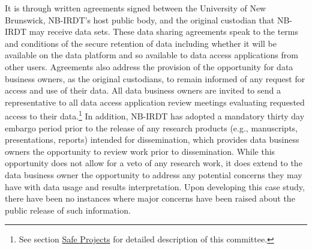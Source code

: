 \documentclass[
]{book}
\begin{document}
It is through written agreements signed between the University of New Brunswick, NB-IRDT's host public body, and the original custodian that NB-IRDT may receive data sets. These data sharing agreements speak to the terms and conditions of the secure retention of data including whether it will be available on the data platform and so available to data access applications from other users. Agreements also address the provision of the opportunity for data business owners, as the original custodians, to remain informed of any request for access and use of their data. All data business owners are invited to send a representative to all data access application review meetings evaluating requested access to their data.\footnote{See section \protect\hyperlink{safe-projects-8}{Safe Projects} for detailed description of this committee.} In addition, NB-IRDT has adopted a mandatory thirty day embargo period prior to the release of any research products (e.g., manuscripts, presentations, reports) intended for dissemination, which provides data business owners the opportunity to review work prior to dissemination. While this opportunity does not allow for a veto of any research work, it does extend to the data business owner the opportunity to address any potential concerns they may have with data usage and results interpretation. Upon developing this case study, there have been no instances where major concerns have been raised about the public release of such information.
\end{document}
